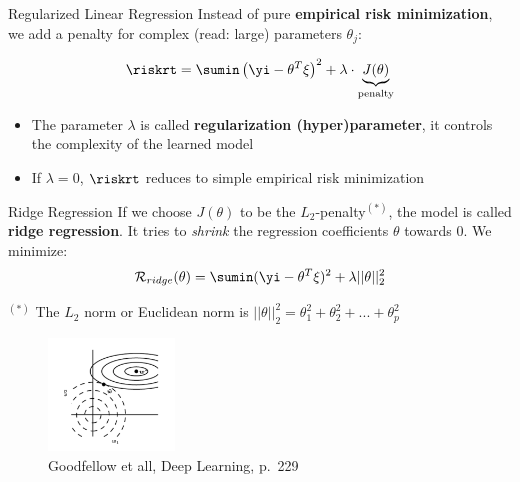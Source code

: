 \begin{frame}{Regularized Linear Regression}
Instead of pure \textbf{empirical risk minimization}, we add a penalty
for complex (read: large) parameters \(\theta_j\):

\[
\riskrt = \sumin \left(\yi - \theta^T \xi\right)^2 + \lambda \cdot \underbrace{J(\theta)}_{\text{penalty}}
\]

\begin{itemize}
\item The parameter \(\lambda\) is called \textbf{regularization (hyper)parameter}, it controls the complexity of the learned model  
\item If \(\lambda = 0\), \(\riskrt\) reduces to simple empirical risk minimization
\end{itemize}

\end{frame}


\begin{frame}{Ridge Regression}
If we choose \(J(\theta)\) to be the \(L_2\)-penalty\(^{(*)}\), the
model is called \textbf{ridge regression}.
It tries to \emph{shrink} the regression coefficients \(\theta\) towards
\(0\). We minimize:
\vspace{-0.3cm}
\[
\mathcal{R}_{ridge}(\theta) = \sumin (\yi - \theta^T \xi)^2 + \lambda ||\theta||_2^2
\]

\pause

$^{(*)}$ The $L_2$ norm or Euclidean norm is $||\theta||_2^2 = \theta_1^2 + \theta_2^2 + ... + \theta_p^2$
\vspace{-0.3cm}
\begin{figure}
\center
\includegraphics[width=0.3\textwidth]{plots/regularizedRegression.png}
\caption{Goodfellow et all, Deep Learning, p.~229}
\end{figure}
\end{frame}



